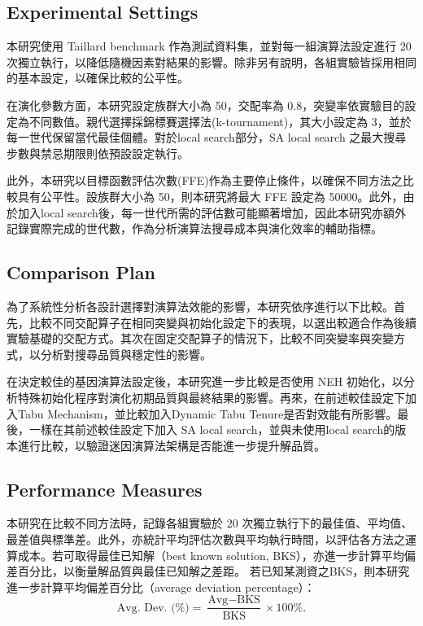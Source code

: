 \documentclass[conference]{IEEEtran}
\begin{document}
\subsection{Experimental Settings}

本研究使用 Taillard benchmark 作為測試資料集，並對每一組演算法設定進行 20 次獨立執行，以降低隨機因素對結果的影響。除非另有說明，各組實驗皆採用相同的基本設定，以確保比較的公平性。

在演化參數方面，本研究設定族群大小為 50，交配率為 0.8，突變率依實驗目的設定為不同數值。親代選擇採錦標賽選擇法(k-tournament)，其大小設定為 3，並於每一世代保留當代最佳個體。對於local search部分，SA local search 之最大搜尋步數與禁忌期限則依預設設定執行。

此外，本研究以目標函數評估次數(FFE)作為主要停止條件，以確保不同方法之比較具有公平性。設族群大小為 50，則本研究將最大 FFE 設定為 50000。此外，由於加入local search後，每一世代所需的評估數可能顯著增加，因此本研究亦額外記錄實際完成的世代數，作為分析演算法搜尋成本與演化效率的輔助指標。
\subsection{Comparison Plan}

為了系統性分析各設計選擇對演算法效能的影響，本研究依序進行以下比較。首先，比較不同交配算子在相同突變與初始化設定下的表現，以選出較適合作為後續實驗基礎的交配方式。其次在固定交配算子的情況下，比較不同突變率與突變方式，以分析對搜尋品質與穩定性的影響。

在決定較佳的基因演算法設定後，本研究進一步比較是否使用 NEH 初始化，以分析特殊初始化程序對演化初期品質與最終結果的影響。再來，在前述較佳設定下加入Tabu Mechanism，並比較加入Dynamic Tabu Tenure是否對效能有所影響。最後，一樣在其前述較佳設定下加入 SA local search，並與未使用local search的版本進行比較，以驗證迷因演算法架構是否能進一步提升解品質。

\subsection{Performance Measures}
本研究在比較不同方法時，記錄各組實驗於 20 次獨立執行下的最佳值、平均值、最差值與標準差。此外，亦統計平均評估次數與平均執行時間，以評估各方法之運算成本。若可取得最佳已知解（best known solution, BKS），亦進一步計算平均偏差百分比，以衡量解品質與最佳已知解之差距。
若已知某測資之BKS，則本研究進一步計算平均偏差百分比（average deviation percentage）：
\[\text{Avg. Dev. (\%)} = \frac{\text{Avg} - \text{BKS}}{\text{BKS}} \times 100\%.\]\par
\end{document}
